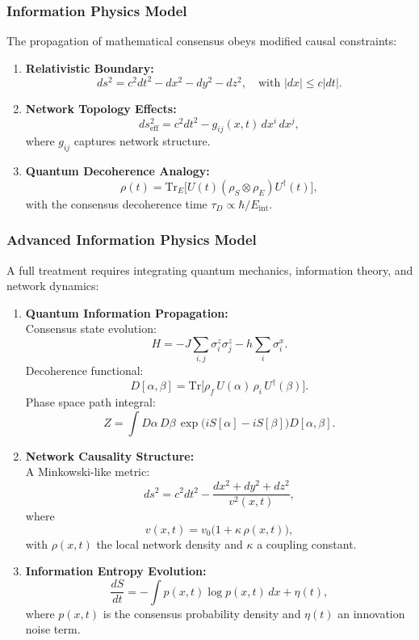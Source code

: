 \documentclass[11pt]{article}
\begin{document}
\subsubsection{Information Physics Model}

The propagation of mathematical consensus obeys modified causal constraints:
\begin{enumerate}[label=(\arabic*)]
    \item \textbf{Relativistic Boundary:}
    \[
    ds^2 = c^2dt^2 - dx^2 - dy^2 - dz^2, \quad \text{with } |dx| \leq c|dt|.
    \]
    \item \textbf{Network Topology Effects:}
    \[
    ds^2_{\text{eff}} = c^2dt^2 - g_{ij}(x,t)\,dx^i\,dx^j,
    \]
    where $g_{ij}$ captures network structure.
    \item \textbf{Quantum Decoherence Analogy:}
    \[
    \rho(t)=\text{Tr}_E\bigl[U(t)(\rho_S\otimes\rho_E)U^\dagger(t)\bigr],
    \]
    with the consensus decoherence time $\tau_D\propto \hbar/E_{\text{int}}$.
\end{enumerate}

\subsubsection{Advanced Information Physics Model}

A full treatment requires integrating quantum mechanics, information theory, and network dynamics:
\begin{enumerate}[label=(\arabic*)]
    \item \textbf{Quantum Information Propagation:} \\
    Consensus state evolution:
    \[
    H = -J\sum_{i,j}\sigma_i^z\sigma_j^z - h\sum_i \sigma_i^x.
    \]
    Decoherence functional:
    \[
    D[\alpha,\beta]=\text{Tr}\bigl[\rho_f\,U(\alpha)\,\rho_i\,U^\dagger(\beta)\bigr].
    \]
    Phase space path integral:
    \[
    Z=\int D\alpha\,D\beta\, \exp\bigl(iS[\alpha]-iS[\beta]\bigr) D[\alpha,\beta].
    \]
    
    \item \textbf{Network Causality Structure:} \\
    A Minkowski-like metric:
    \[
    ds^2 = c^2 dt^2 - \frac{dx^2+dy^2+dz^2}{v^2(x,t)},
    \]
    where
    \[
    v(x,t)=v_0\bigl(1+\kappa\,\rho(x,t)\bigr),
    \]
    with $\rho(x,t)$ the local network density and $\kappa$ a coupling constant.
    
    \item \textbf{Information Entropy Evolution:} \\
    \[
    \frac{dS}{dt} = -\int p(x,t)\log p(x,t)\,dx + \eta(t),
    \]
    where $p(x,t)$ is the consensus probability density and $\eta(t)$ an innovation noise term.
\end{enumerate}
\end{document}
